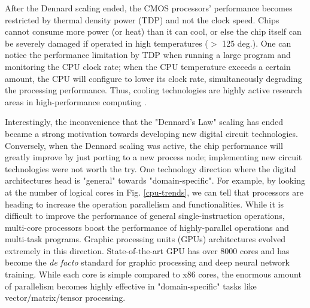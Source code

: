 After the Dennard scaling ended, the CMOS processors' performance becomes restricted by thermal density power (TDP) and not the clock speed. Chips cannot consume more power (or heat) than it can cool, or else the chip itself can be severely damaged if operated in high temperatures ($>$ 125 deg.).
One can notice the performance limitation by TDP when running a large program and monitoring the CPU clock rate; when the CPU temperature exceeds a certain amount, the CPU will configure to lower its clock rate, simultaneously degrading the processing performance. Thus, cooling technologies are highly active research areas in high-performance computing \cite{abci}.

Interestingly, the inconvenience that the "Dennard's Law" scaling has ended became a strong motivation towards developing new digital circuit technologies.
Conversely, when the Dennard scaling was active, the chip performance will greatly improve by just porting to a new process node; implementing new circuit technologies were not worth the try.
One technology direction where the digital architectures head is "general" towards "domain-specific".
For example, by looking at the number of logical cores in Fig. \ref{cpu-trends}, we can tell that processors are heading to increase the operation parallelism and functionalities. 
While it is difficult to improve the performance of general single-instruction operations, multi-core processors boost the performance of highly-parallel operations and multi-task programs.
Graphic processing units (GPUs) architectures evolved extremely in this direction. State-of-the-art GPU has over 8000 cores \cite{v100} and has become the \textit{de facto} standard for graphic processing and deep neural network training. While each core is simple compared to x86 cores, the enormous amount of parallelism becomes highly effective in "domain-specific" tasks like vector/matrix/tensor processing.

